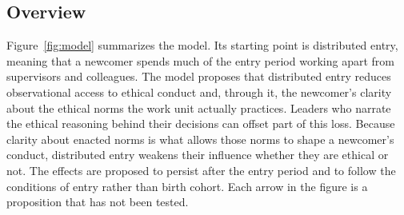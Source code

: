 \subsection{Overview}

Figure~\ref{fig:model} summarizes the model. Its starting point is distributed entry, meaning that a newcomer spends much of the entry period working apart from supervisors and colleagues. The model proposes that distributed entry reduces observational access to ethical conduct and, through it, the newcomer's clarity about the ethical norms the work unit actually practices. Leaders who narrate the ethical reasoning behind their decisions can offset part of this loss. Because clarity about enacted norms is what allows those norms to shape a newcomer's conduct, distributed entry weakens their influence whether they are ethical or not. The effects are proposed to persist after the entry period and to follow the conditions of entry rather than birth cohort. Each arrow in the figure is a proposition that has not been tested.

